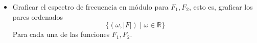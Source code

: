 \documentclass[12pt,a4paper]{report}
\begin{document}
\begin{enumerate}[label=\alph*),left=0pt]
\begin {itemize}[left=0pt]
\begin{figure}[h!]
\begin{minipage}{0.45\textwidth}
            \caption{Espectro de frecuencia en fase para $x_2$}
            \label{fig:imagen2}
          \end{minipage}
        \end{figure}

        \textbf{Reflexionar:} ¿El espectro de frecuencia en fase es discreto o continuo? ¿El gráfico admite una simetría
        par, impar o ninguna?\\

        En ambos casos, el espectro de la frecuencia en fase es una señal de tiempo continuo y admite simetria par.\\

      \item Graficar el espectro de frecuencia en módulo para $F_1, F_2$, esto es, graficar los pares ordenados
        $$\{(\omega, |F|) \mid \omega \in \mathbb{R}\}$$
        Para cada una de las funciones $F_1, F_2$.\newline


\end{itemize}
\end{enumerate}
\end{document}
